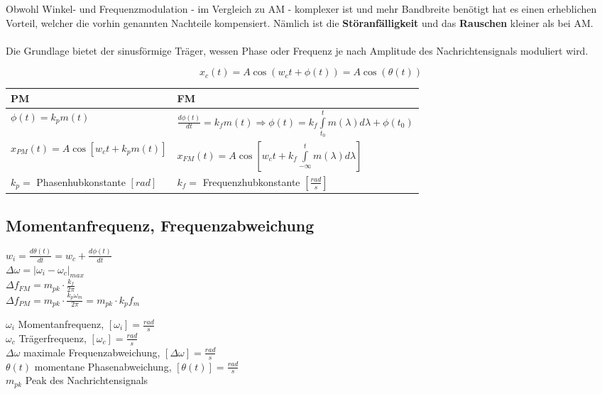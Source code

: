 Obwohl Winkel- und Frequenzmodulation - im Vergleich zu AM - komplexer ist und mehr Bandbreite
benötigt hat es einen erheblichen Vorteil, welcher die vorhin genannten Nachteile kompensiert.
Nämlich ist die \textbf{Störanfälligkeit} und das \textbf{Rauschen} kleiner als bei AM. \\
\\
Die Grundlage bietet der sinusförmige Träger, wessen Phase oder Frequenz je nach Amplitude des 
Nachrichtensignals moduliert wird.

$$\boxed{ x_c(t) = A \cos(w_c t + \phi(t)) = A \cos(\theta(t)) }$$

\begin{center}
\renewcommand{\arraystretch}{2}
\begin{tabular}{|p{8cm}|p{8cm}|}
	\hline
	\textbf{PM} &	\textbf{FM}\\
	\hline
	$\phi(t) = k_p m(t)$ &
	$ \frac{d \phi(t)}{dt} = k_f m(t) \Rightarrow \phi(t) = k_f \int\limits_{t_0}^{t} m(\lambda)
	d\lambda + \phi(t_0)$\\
	$x_{PM}(t) = A \cos[w_c t + k_p m(t)]$ &
	$x_{FM}(t) = A \cos[w_c t + k_f \int\limits_{- \infty}^{t} m(\lambda)
	d\lambda]$\\
	\hline
	$k_p=$ Phasenhubkonstante $[rad]$ & $k_f=$ Frequenzhubkonstante
	$[\frac{rad}{s}]$\\
	\hline
\end{tabular} 
\renewcommand{\arraystretch}{1}
\end{center}


\subsection{Momentanfrequenz, Frequenzabweichung}
\begin{multicols}{2}
	\begin{center}
		$ w_i = \frac{d \theta(t)}{dt} = w_c + \frac{d \phi(t)}{dt} $\\
		$ \Delta \omega = \left| \omega_i - \omega_c \right|_{max} $\\
		$ \Delta f_{FM} =  m_{pk} \cdot \frac{k_f}{2\pi}$\\
		$ \Delta f_{PM} = m_{pk} \cdot \frac{k_p \omega_m}{2\pi} =  m_{pk} \cdot
		k_p f_m$
	\end{center}
\columnbreak

	$\omega_i$ Momentanfrequenz, $[\omega_i] = \frac{rad}{s}$ \\
	$\omega_c$ Trägerfrequenz, $[\omega_c] = \frac{rad}{s}$ \\
	$\Delta \omega$ maximale Frequenzabweichung, $[\Delta \omega] = \frac{rad}{s}$ \\
	$\theta(t)$ momentane Phasenabweichung, $[\theta(t)] = \frac{rad}{s}$ \\
	$m_{pk}$ Peak des Nachrichtensignals
\end{multicols}


